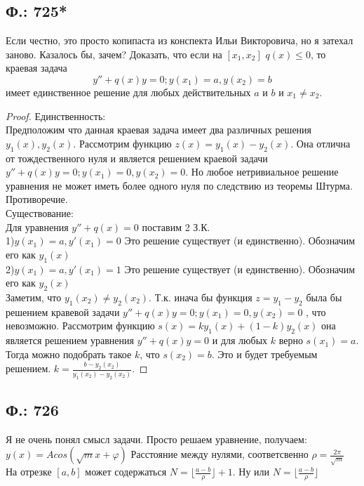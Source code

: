 \documentclass{article}
\begin{document}
\subsection{Ф.: 725*}
\textcolor[rgb]{1,1,1}{Если честно, это просто копипаста из конспекта Ильи Викторовича, но я затехал заново. Казалось бы, зачем?}
Доказать, что если на $[x_1,x_2]$ $q(x)\leq 0$, то краевая задача 
\begin{equation}
y''+q(x)y=0 ;   y(x_1)=a,y(x_2)=b
\end{equation}
имеет единственное решение для любых действительных $a$ и $b$ и $x_1 \neq x_2$.
\begin{proof}
    Единственность:\\
Предположим что данная краевая задача имеет два различных решения $y_1(x),y_2(x)$. Рассмотрим функцию $z(x)=y_1(x)-y_2(x)$. Она отлична от тождественного нуля и является решением краевой задачи $y''+q(x)y=0 ;   y(x_1)=0,y(x_2)=0$. Но любое нетривиальное решение уравнения не может иметь более одного нуля по следствию из теоремы Штурма. Противоречие.\\

    Существование:\\
Для уравнения $y'' + q(x)=0$ поставим 2 З.К.\\
1)$y(x_1)=a,y'(x_1)=0$ Это решение существует (и единственно). Обозначим его как $y_1(x)$\\
2)$y(x_1)=a,y'(x_1)=1$ Это решение существует (и единственно). Обозначим его как $y_2(x)$\\
Заметим, что $y_1(x_2) \neq y_2(x_2)$. Т.к. инача бы функция $z=y_1-y_2$ была бы решением кравевой задачи $y''+q(x)y=0;   y(x_1)=0,y(x_2)=0$ , что невозможно.
Рассмотрим функцию $s(x)=k y_1(x)+(1-k) y_2(x)$ она является решением уравнения $y''+q(x)y=0 $ и для любых $k$ верно $s(x_1) = a$.
Тогда можно подобрать такое $k$, что $s(x_2)=b$. Это и будет требуемым решением. $k=\frac{b-y_2(x_2)}{y_1(x_2)-y_2(x_2)}$.
\end{proof}
\subsection{Ф.: 726}
Я не очень понял смысл задачи. Просто решаем уравнение, получаем: $y(x)=A cos(\sqrt m x + \varphi)$ Расстояние между нулями, соответсвенно $\rho = \frac{2 \pi}{\sqrt m}$ На отрезке $[a,b]$ может содержаться $ N = \lfloor \frac{a-b}{\rho} \rfloor + 1$. Ну или  $N = \lfloor \frac{a-b}{\rho} \rfloor$
\end{document}
